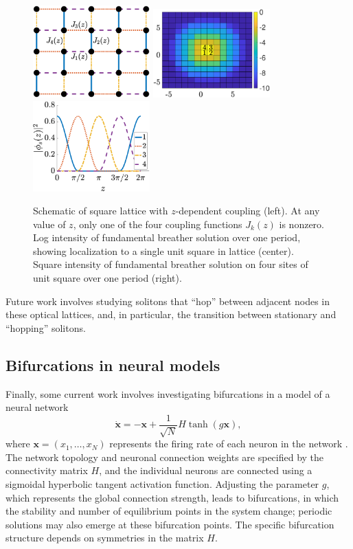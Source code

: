 \documentclass[11pt,reqno,oneside]{article}
\theoremstyle{definition}
\theoremstyle{remark}
\newcommand{\xvec}{\mathbf{x}}
\begin{document}
\begin{figure}
    \centering
    \includegraphics[width=4.5cm]{images/lattice.eps}
    \includegraphics[width=4.5cm]{images/fundc1map.eps}
    \includegraphics[width=4.5cm]{images/fundc1sol.eps}
    \caption{Schematic of square lattice with $z$-dependent coupling (left). At any value of $z$, only one of the four coupling functions $J_k(z)$ is nonzero. Log intensity of fundamental breather solution over one period, showing localization to a single unit square in lattice (center). Square intensity of fundamental breather solution on four sites of unit square over one period (right).}
    \label{fig:Rechtsman}
\end{figure} 
Future work involves studying solitons that ``hop'' between adjacent nodes in these optical lattices, and, in particular, the transition between stationary and ``hopping'' solitons.

\subsection*{Bifurcations in neural models}

Finally, some current work involves investigating bifurcations in a model of a neural network
\begin{equation*}
    \dot{\xvec} = -\xvec  + \frac{1}{\sqrt{N}} H\tanh (g \xvec),
\end{equation*}
where $\xvec = (x_1, \dots, x_N)$ represents the firing rate of each neuron in the network \cite{ParkerNeuro,Barreiro2017}. The network topology and neuronal connection weights are specified by the connectivity matrix $H$, and the individual neurons are connected using a sigmoidal hyperbolic tangent activation function. Adjusting the parameter $g$, which represents the global connection strength, leads to bifurcations, in which the stability and number of equilibrium points in the system change; periodic solutions may also emerge at these bifurcation points. The specific bifurcation structure depends on symmetries in the matrix $H$. 
\end{document}

